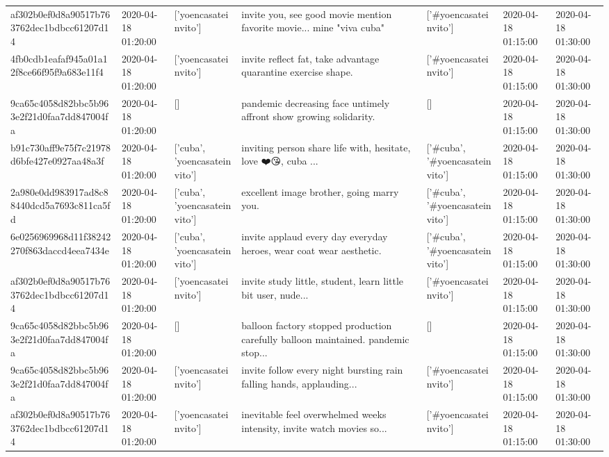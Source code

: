 \begin{tabular}{lllllll}
af302b0ef0d8a90517b763762dec1bdbcc61207d14 & 2020-04-18 01:20:00 & ['yoencasateinvito'] & invite you, see good movie mention favorite movie... mine "viva cuba" & ['#yoencasateinvito'] & 2020-04-18 01:15:00 & 2020-04-18 01:30:00 \\
4fb0cdb1eafaf945a01a12f8ce66f95f9a683e11f4 & 2020-04-18 01:20:00 & ['yoencasateinvito'] & invite reflect fat, take advantage quarantine exercise shape. & ['#yoencasateinvito'] & 2020-04-18 01:15:00 & 2020-04-18 01:30:00 \\
9ca65c4058d82bbc5b963e2f21d0faa7dd847004fa & 2020-04-18 01:20:00 & [] & pandemic decreasing face untimely affront show growing solidarity. & [] & 2020-04-18 01:15:00 & 2020-04-18 01:30:00 \\
b91c730aff9e75f7c21978d6bfe427e0927aa48a3f & 2020-04-18 01:20:00 & ['cuba', 'yoencasateinvito'] & inviting person share life with, hesitate, love ❤️😘, cuba ... & ['#cuba', '#yoencasateinvito'] & 2020-04-18 01:15:00 & 2020-04-18 01:30:00 \\
2a980e0dd983917ad8c88440dcd5a7693c811ca5fd & 2020-04-18 01:20:00 & ['cuba', 'yoencasateinvito'] & excellent image brother, going marry you. & ['#cuba', '#yoencasateinvito'] & 2020-04-18 01:15:00 & 2020-04-18 01:30:00 \\
6e0256969968d11f38242270f863daccd4eea7434e & 2020-04-18 01:20:00 & ['cuba', 'yoencasateinvito'] & invite applaud every day everyday heroes, wear coat wear aesthetic. & ['#cuba', '#yoencasateinvito'] & 2020-04-18 01:15:00 & 2020-04-18 01:30:00 \\
af302b0ef0d8a90517b763762dec1bdbcc61207d14 & 2020-04-18 01:20:00 & ['yoencasateinvito'] & invite study little, student, learn little bit user, nude... & ['#yoencasateinvito'] & 2020-04-18 01:15:00 & 2020-04-18 01:30:00 \\
9ca65c4058d82bbc5b963e2f21d0faa7dd847004fa & 2020-04-18 01:20:00 & [] & balloon factory stopped production carefully balloon maintained. pandemic stop... & [] & 2020-04-18 01:15:00 & 2020-04-18 01:30:00 \\
9ca65c4058d82bbc5b963e2f21d0faa7dd847004fa & 2020-04-18 01:20:00 & ['yoencasateinvito'] & invite follow every night bursting rain falling hands, applauding... & ['#yoencasateinvito'] & 2020-04-18 01:15:00 & 2020-04-18 01:30:00 \\
af302b0ef0d8a90517b763762dec1bdbcc61207d14 & 2020-04-18 01:20:00 & ['yoencasateinvito'] & inevitable feel overwhelmed weeks intensity, invite watch movies so... & ['#yoencasateinvito'] & 2020-04-18 01:15:00 & 2020-04-18 01:30:00 \\

\end{tabular}
